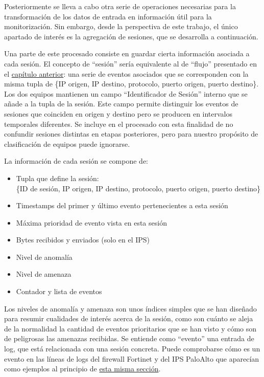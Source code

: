 Posteriormente se lleva a cabo otra serie de operaciones necesarias para la transformación de los datos de entrada en información útil para la monitorización.
Sin embargo, desde la perspectiva de este trabajo, el único apartado de interés es la agregación de sesiones, que se desarrolla a continuación.

Una parte de este procesado consiste en guardar cierta información asociada a cada sesión.
El concepto de ``sesión'' sería equivalente al de ``flujo'' presentado en el \hyperref[chap:estadodelarte]{capítulo anterior}:
una serie de eventos asociados que se corresponden con la misma tupla de \{IP origen, IP destino, protocolo, puerto origen, puerto destino\}.
Los dos equipos mantienen un campo ``Identificador de Sesión'' interno que se añade a la tupla de la sesión.
Este campo permite distinguir los eventos de sesiones que coinciden en origen y destino pero se producen en intervalos temporales diferentes.
Se incluye en el procesado con esta finalidad de no confundir sesiones distintas en etapas posteriores, pero para nuestro propósito de clasificación de equipos puede ignorarse.

La información de cada sesión se compone de:
\begin{itemize}
    \item Tupla que define la sesión:\\\{ID de sesión, IP origen, IP destino, protocolo, puerto origen, puerto destino\}
    \item Timestamps del primer y último evento pertenecientes a esta sesión
    \item Máxima prioridad de evento vista en esta sesión
    \item Bytes recibidos y enviados (solo en el IPS)
    \item Nivel de anomalía
    \item Nivel de amenaza
    \item Contador y lista de eventos
\end{itemize}

Los niveles de anomalía y amenaza son unos índices simples que se han diseñado para resumir cualidades de interés acerca de la sesión, como son
cuánto se aleja de la normalidad la cantidad de eventos prioritarios que se han visto y cómo son de peligrosas las amenazas recibidas.
Se entiende como ``evento'' una entrada de log, que está relacionada con una sesión concreta.
Puede comprobarse cómo es un evento en las líneas de logs del firewall Fortinet y del IPS PaloAlto que aparecían como ejemplos al principio de \hyperref[sec:extraccionyfiltrado]{esta misma sección}.

